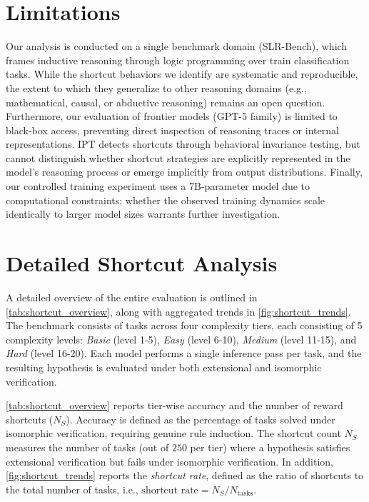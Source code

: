 
\section{Limitations}
Our analysis is conducted on a single benchmark domain (SLR-Bench), which frames inductive reasoning through logic programming over train classification tasks. While the shortcut behaviors we identify are systematic and reproducible, the extent to which they generalize to other reasoning domains (e.g., mathematical, causal, or abductive reasoning) remains an open question. Furthermore, our evaluation of frontier models (GPT-5 family) is limited to black-box access, preventing direct inspection of reasoning traces or internal representations. IPT detects shortcuts through behavioral invariance testing, but cannot distinguish whether shortcut strategies are explicitly represented in the model's reasoning process or emerge implicitly from output distributions. Finally, our controlled training experiment uses a 7B-parameter model due to computational constraints; whether the observed training dynamics scale identically to larger model sizes warrants further investigation.




\section{Detailed Shortcut Analysis} \label{app:sec:shortcut_analysis}
A detailed overview of the entire evaluation is outlined in \autoref{tab:shortcut_overview}, along with aggregated trends in \autoref{fig:shortcut_trends}. The benchmark consists of tasks across four complexity tiers, each consisting of 5 complexity levels: \textit{Basic} (level 1-5), \textit{Easy} (level 6-10), \textit{Medium} (level 11-15), and \textit{Hard} (level 16-20). Each model performs a single inference pass per task, and the resulting hypothesis is evaluated under both extensional and isomorphic verification.

\autoref{tab:shortcut_overview} reports tier-wise accuracy and the number of reward shortcuts ($N_S$). Accuracy is defined as the percentage of tasks solved under isomorphic verification, requiring genuine rule induction. The shortcut count $N_S$ measures the number of tasks (out of $250$ per tier) where a hypothesis satisfies extensional verification but fails under isomorphic verification. In addition, \autoref{fig:shortcut_trends} reports the \textit{shortcut rate}, defined as the ratio of shortcuts to the total number of tasks, i.e.,  $\text{shortcut rate} = N_S / N_{\text{tasks}}$.


